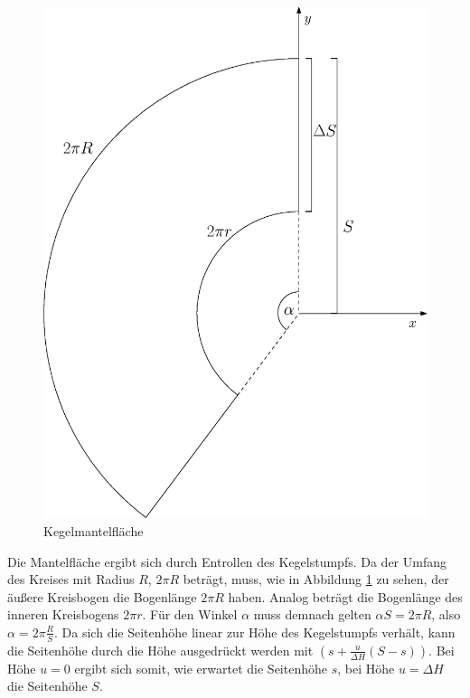 \begin{figure}[!htb]
	\centering
	\includegraphics[scale=.4]{images/coneLateral.eps}
	\caption{Kegelmantelfläche}
	\label{fig:coneLateral}
\end{figure}

Die Mantelfläche ergibt sich durch Entrollen des Kegelstumpfs. Da der Umfang des Kreises mit Radius $R$, $2\pi R$ beträgt, muss, wie in Abbildung \ref{fig:coneLateral} zu sehen, der äußere Kreisbogen die Bogenlänge $2\pi R$ haben. Analog beträgt die Bogenlänge des inneren Kreisbogens $2\pi r$. Für den Winkel $\alpha$ muss demnach gelten $\alpha S = 2\pi R$, also  $\alpha = 2\pi\frac{R}{S}$. Da sich die Seitenhöhe linear zur Höhe des Kegelstumpfs verhält, kann die Seitenhöhe durch die Höhe ausgedrückt werden mit $(s + \frac{u}{\Delta H}(S-s))$. Bei Höhe $u = 0$ ergibt sich somit, wie erwartet die Seitenhöhe $s$, bei Höhe $u = \Delta H$ die Seitenhöhe $S$.

